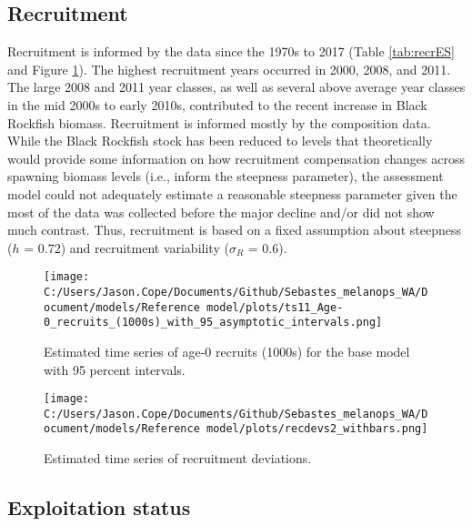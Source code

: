\documentclass[11pt,
  english,
  letterpaper,
]{article}
\begin{document}
\hypertarget{recruitment}{%
\subsection*{Recruitment}\label{recruitment}}

Recruitment is informed by the data since the 1970s to 2017 (Table \ref{tab:recrES} and Figure \ref{fig:es-recruits}). The highest recruitment years occurred in 2000, 2008, and 2011. The large 2008 and 2011 year classes, as well as several above average year classes in the mid 2000s to early 2010s, contributed to the recent increase in Black Rockfish biomass. Recruitment is informed mostly by the composition data. While the Black Rockfish stock has been reduced to levels that theoretically would provide some information on how recruitment compensation changes across spawning biomass levels (i.e., inform the steepness parameter), the assessment model could not adequately estimate a reasonable steepness parameter given the most of the data was collected before the major decline and/or did not show much contrast. Thus, recruitment is based on a fixed assumption about steepness (\(h\) = 0.72) and recruitment variability (\(\sigma_R\) = 0.6).



\begin{figure}
\centering
\texttt{[image: C:/Users/Jason.Cope/Documents/Github/Sebastes\_melanops\_WA/Document/models/Reference model/plots/ts11\_Age-0\_recruits\_(1000s)\_with\_95\_asymptotic\_intervals.png]}
\caption{Estimated time series of age-0 recruits (1000s) for the base model with 95 percent intervals.\label{fig:es-recruits}}
\end{figure}

\begin{figure}
\centering
\texttt{[image: C:/Users/Jason.Cope/Documents/Github/Sebastes\_melanops\_WA/Document/models/Reference model/plots/recdevs2\_withbars.png]}
\caption{Estimated time series of recruitment deviations.\label{fig:es-recdev}}
\end{figure}

\hypertarget{exploitation-status}{%
\subsection*{Exploitation status}\label{exploitation-status}}
\end{document}
